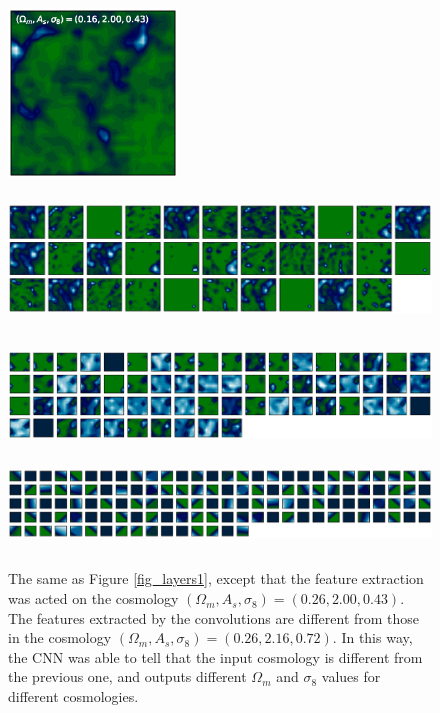 \documentclass[twocolumn]{aastex61}
\begin{document}
\begin{figure}
   \centering
    \includegraphics[height=4.5cm]{layeroutput_00.eps}
    \includegraphics[height=4cm]{layeroutput_01.eps}
    \includegraphics[height=3cm]{layeroutput_02.eps}
    \includegraphics[height=2.5cm]{layeroutput_03.eps}
   \caption{\label{fig_layers2}
   The same as Figure \ref{fig_layers1}, except that the feature extraction was acted on the cosmology $(\Omega_m, A_s, \sigma_8)=(0.26, 2.00, 0.43)$. 
   The features extracted by the convolutions are different from those in the cosmology $(\Omega_m, A_s, \sigma_8)=(0.26, 2.16, 0.72)$.
   In this way, the CNN was able to tell that the input cosmology is different from the previous one, 
   and outputs different $\Omega_m$ and $\sigma_8$ values for different cosmologies.
   }
\end{figure}
\end{document}
